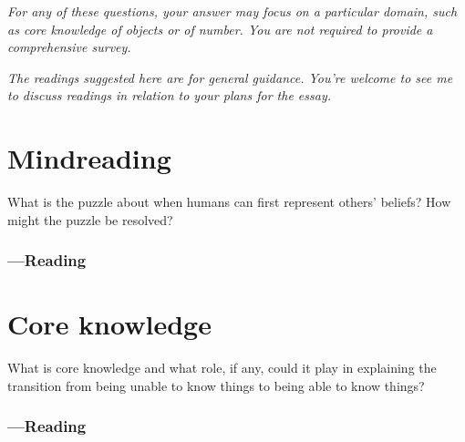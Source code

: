 \documentclass[12pt,\papersize]{extarticle}
\begin{document}
\setlength\footnotesep{1em}


\maketitle

\setcounter{tocdepth}{1}

\noindent
\textit{For any of these questions, your answer may focus on a particular domain, such as core knowledge of objects or of number.  You are not required to provide a comprehensive survey.}

\emph{The readings suggested here are for general guidance.  You’re welcome to see me to discuss readings in relation to your plans for the essay.}



\tableofcontents
\clearpage


\section{Mindreading}
What is the puzzle about when humans can first represent others’ beliefs?
How might the puzzle be resolved?

\subsubsection{---Reading}







\section{Core knowledge}
What is core knowledge and what role, if any, could it play in explaining the transition from being unable to know things to being able to know things?


\subsubsection{---Reading}



\end{document}
